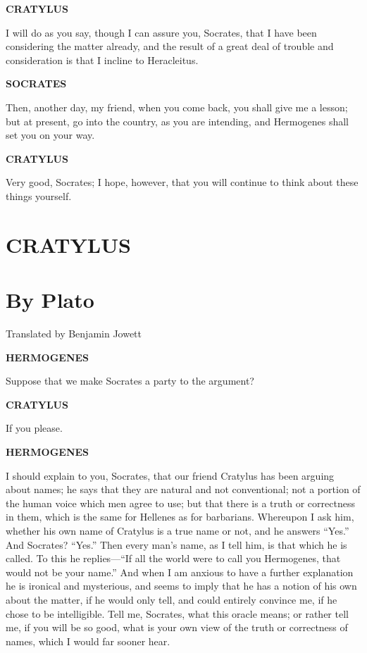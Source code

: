 \documentclass[11pt,letter]{article}
\begin{document}
\par \textbf{CRATYLUS}
\par   I will do as you say, though I can assure you, Socrates, that I have been considering the matter already, and the result of a great deal of trouble and consideration is that I incline to Heracleitus.

\par \textbf{SOCRATES}
\par   Then, another day, my friend, when you come back, you shall give me a lesson; but at present, go into the country, as you are intending, and Hermogenes shall set you on your way.

\par \textbf{CRATYLUS}
\par   Very good, Socrates; I hope, however, that you will continue to think about these things yourself.
\section{CRATYLUS}\section{By Plato}
\par  Translated by Benjamin Jowett
 
\par \textbf{HERMOGENES}
\par   Suppose that we make Socrates a party to the argument?

\par \textbf{CRATYLUS}
\par   If you please.

\par \textbf{HERMOGENES}
\par   I should explain to you, Socrates, that our friend Cratylus has been arguing about names; he says that they are natural and not conventional; not a portion of the human voice which men agree to use; but that there is a truth or correctness in them, which is the same for Hellenes as for barbarians. Whereupon I ask him, whether his own name of Cratylus is a true name or not, and he answers “Yes.” And Socrates? “Yes.” Then every man’s name, as I tell him, is that which he is called. To this he replies—“If all the world were to call you Hermogenes, that would not be your name.” And when I am anxious to have a further explanation he is ironical and mysterious, and seems to imply that he has a notion of his own about the matter, if he would only tell, and could entirely convince me, if he chose to be intelligible. Tell me, Socrates, what this oracle means; or rather tell me, if you will be so good, what is your own view of the truth or correctness of names, which I would far sooner hear.
\end{document}
